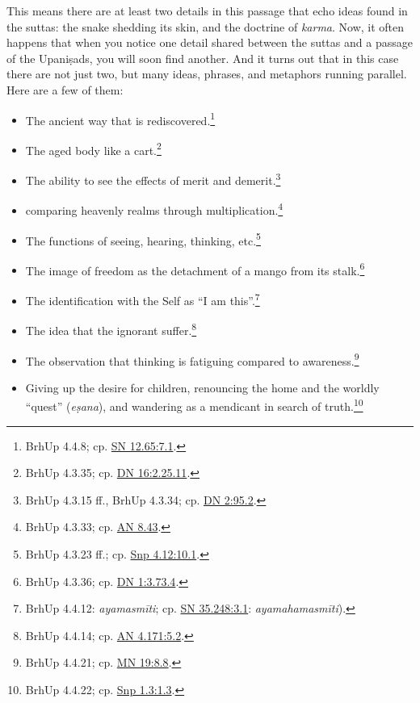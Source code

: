 \documentclass[12pt,openany]{book}%
\begin{document}
This means there are at least two details in this passage that echo ideas found in the suttas: the snake shedding its skin, and the doctrine of \textit{karma}. Now, it often happens that when you notice one detail shared between the suttas and a passage of the \textsanskrit{Upaniṣads}, you will soon find another. And it turns out that in this case there are not just two, but many ideas, phrases, and metaphors running parallel. Here are a few of them:

\begin{itemize}%
\item The ancient way that is rediscovered.\footnote{BrhUp 4.4.8; cp. \href{https://suttacentral.net/sn12.65/en/sujato\#7.1}{SN 12.65:7.1}. }%
\item The aged body like a cart.\footnote{BrhUp 4.3.35; cp. \href{https://suttacentral.net/dn16/en/sujato\#2.25.11}{DN 16:2.25.11}. }%
\item The ability to see the effects of merit and demerit.\footnote{BrhUp 4.3.15 ff., BrhUp 4.3.34; cp. \href{https://suttacentral.net/dn2/en/sujato\#95.2}{DN 2:95.2}. }%
\item comparing heavenly realms through multiplication.\footnote{BrhUp 4.3.33; cp. \href{https://suttacentral.net/an8.43/en/sujato}{AN 8.43}. }%
\item The functions of seeing, hearing, thinking, etc.\footnote{BrhUp 4.3.23 ff.; cp. \href{https://suttacentral.net/snp4.12/en/sujato\#10.1}{Snp 4.12:10.1}. }%
\item The image of freedom as the detachment of a mango from its stalk.\footnote{BrhUp 4.3.36; cp. \href{https://suttacentral.net/dn1/en/sujato\#3.73.4}{DN 1:3.73.4}. }%
\item The identification with the Self as “I am this”.\footnote{BrhUp 4.4.12: \textit{\textsanskrit{ayamasmīti}}; cp. \href{https://suttacentral.net/sn35.248/en/sujato\#3.1}{SN 35.248:3.1}: \textit{\textsanskrit{ayamahamasmīti}}). }%
\item The idea that the ignorant suffer.\footnote{BrhUp 4.4.14; cp. \href{https://suttacentral.net/an4.171/en/sujato\#5.2}{AN 4.171:5.2}. }%
\item The observation that thinking is fatiguing compared to awareness.\footnote{BrhUp 4.4.21; cp. \href{https://suttacentral.net/mn19/en/sujato\#8.8}{MN 19:8.8}. }%
\item Giving up the desire for children, renouncing the home and the worldly “quest” (\textit{\textsanskrit{eṣana}}), and wandering as a mendicant in search of truth.\footnote{BrhUp 4.4.22; cp. \href{https://suttacentral.net/snp1.3/en/sujato\#1.3}{Snp 1.3:1.3}. }%

\end{itemize}
\end{document}
